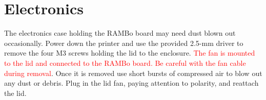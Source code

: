 

\section{Electronics}
The electronics case holding the RAMBo board may need dust blown out occasionally. Power down the printer and use the provided 2.5-mm driver to remove the four M3 screws holding the lid to the enclosure. \textcolor{red}{The fan is mounted to the lid and connected to the RAMBo board. Be careful with the fan cable during removal}. Once it is removed use short bursts of compressed air to blow out any dust or debris. Plug in the lid fan, paying attention to polarity, and reattach the lid.
